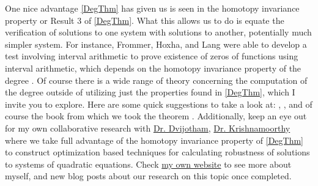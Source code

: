\documentclass[11pt]{article}
\theoremstyle{plain}
\theoremstyle{definition}
\theoremstyle{remark}
\begin{document}
One nice advantage \cref{DegThm} has given us is seen in the homotopy invariance property or Result 3 of \cref{DegThm}.
What this allows us to do is equate the verification of solutions to one system with solutions to another, potentially much simpler system.
For instance, Frommer, Hoxha, and Lang were able to develop a test involving interval arithmetic to prove existence of zeros of functions using interval arithmetic, which depends on the homotopy invariance property of the degree \cite{FrHoLa2007}.
Of course there is a wide range of theory concerning the computation of the degree outside of utilizing just the properties found in \cref{DegThm}, which I invite you to explore. 
Here are some quick suggestions to take a look at: \cite{MoVrYa2002}, \cite{OnTh2006}, and of course the book from which we took the theorem \cite{OrChCh2006}. Additionally, keep an eye out for my own collaborative research with \href{https://dvij.github.io/}{Dr. Dvijotham}, \href{http://www.math.wsu.edu/math/faculty/bkrishna/}{Dr. Krishnamoorthy} where we take full advantage of the homotopy invariance property of  \cref{DegThm} to construct optimization based techniques for calculating robustness of solutions to systems of quadratic equations. Check \href{http://www.benrapone.com/}{my own website} to see more about myself, and new blog posts about our research on this topic once completed.

  

\end{document}
